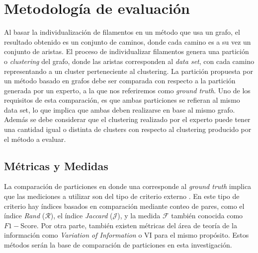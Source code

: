 \chapter{Metodolog\'ia de evaluaci\'on}
\label{chap:metodologia}

Al basar la individualizaci\'on de filamentos en un m\'etodo que usa un grafo, el resultado obtenido es un conjunto de caminos, donde cada camino es a su vez un conjunto de aristas. El proceso de individualizar filamentos genera una partici\'on o {\it clustering} del grafo, donde las aristas corresponden al {\it data set}, con cada camino representando a un cluster perteneciente al clustering. La partici\'on propuesta por un m\'etodo basado en grafos debe ser comparada con respecto a la partici\'on generada por un experto, a la que nos referiremos como {\it ground truth}. Uno de los requisitos de esta comparaci\'on, es que ambas particiones se refieran al mismo data set, lo que implica que ambas deben realizarse en base al mismo grafo. Adem\'as se debe considerar que el clustering realizado por el experto puede tener una cantidad igual o distinta de clusters con respecto al clustering producido por el m\'etodo a evaluar.



\section{M\'etricas y Medidas}
\label{sec:metricasymedidas}


La comparaci\'on de particiones en donde una corresponde al {\it ground truth} implica que las mediciones a utilizar son del tipo de criterio externo \cite{manning20introduction}. En este tipo de criterio hay \'indices basados en comparaci\'on mediante conteo de pares, como el \'indice {\it Rand} ($\mathcal{R}$), el \'indice {\it Jaccard} ($\mathcal{J}$), y la medida $\mathcal{F}$ tambi\'en conocida como $F1-$Score. Por otra parte, tambi\'en existen m\'etricas del \'area de teor\'ia de la informaci\'on como {\it Variation of Information} o VI para el mismo prop\'osito. Estos m\'etodos ser\'an la base de comparaci\'on de particiones en esta investigaci\'on.

